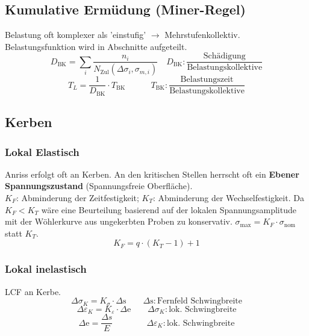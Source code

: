     \subsection{Kumulative Ermüdung (Miner-Regel)}
        Belastung oft komplexer als 'einstufig' $\rightarrow$ Mehrstufenkollektiv. Belastungsfunktion wird in Abschnitte aufgeteilt.
        \vspace{-2mm}
        \[D_{\textrm{BK}}= \sum_{i}\frac{n_{i}}{N_{\textrm{Zul}}(\Delta\sigma_{i},\sigma_{m,i})} \quad D_{\textrm{BK}}: \frac{\textrm{Schädigung}}{\textrm{Belastungskollektive}} \]
        \vspace{-4mm}
        \[T_{L}=\frac{1}{D_{\textrm{BK}}}\cdot T_{\textrm{BK}} \qquad\quad T_{\textrm{BK}}:\frac{\textrm{Belastungszeit}}{\textrm{Belastungskollektive}}\]
    \subsection{Kerben}
        \subsubsection{Lokal Elastisch}
            Anriss erfolgt oft an Kerben. An den kritischen Stellen herrscht oft ein \textbf{Ebener Spannungszustand} (Spannungsfreie Oberfläche).\\ $K_F$: Abminderung der Zeitfestigkeit; $K_T$: Abminderung der Wechselfestigkeit. Da $K_F < K_T$ wäre eine Beurteilung basierend auf der lokalen Spannungsamplitude mit der Wöhlerkurve aus ungekerbten Proben zu konservativ. $\sigma_{\textrm{max}}=K_F \cdot \sigma_{\textrm{nom}}$ statt $K_T$.
            \vspace{-2mm}
            \[K_F = q\cdot(K_T-1)+1\]
        \subsubsection{Lokal inelastisch}
            LCF an Kerbe.
            \vspace{-2mm}
            \[\Delta\sigma_K = K_{\sigma} \cdot \Delta\textrm{s} \qquad \Delta\textrm{s}:\textrm{Fernfeld Schwingbreite}\]
            \[\Delta\varepsilon_K = K_{\varepsilon} \cdot \Delta\textrm{e} \qquad \Delta\sigma_K:\textrm{lok. Schwingbreite}\]
            \[\Delta\textrm{e}=\frac{\Delta s}{E} \qquad\qquad \Delta\varepsilon_K:\textrm{lok. Schwingbreite}\]
